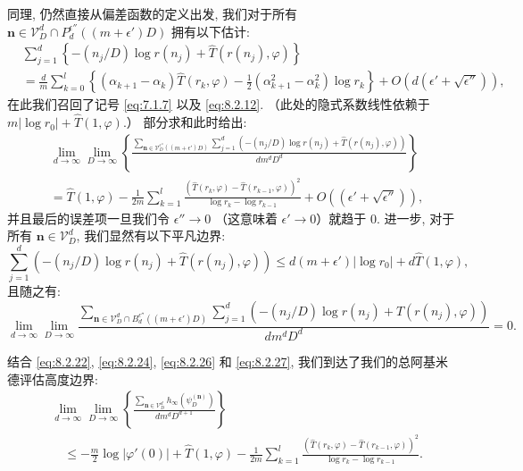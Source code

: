 同理, 仍然直接从偏差函数的定义出发, 我们对于所有 \(\mathbf{n} \in \mathcal{V}_D^d \cap P_d^{\epsilon''}((m+\epsilon')D)\) 
拥有以下估计:
\begin{equation}\label{eq:8.2.25}
\begin{aligned}
&\sum_{j=1}^{d} \left\{ -(n_j/D) \log r(n_j) + \widehat{T}(r(n_j), \varphi) \right\} \\
&= \frac{d}{m} \sum_{k=0}^{l} \left\{ (\alpha_{k+1} - \alpha_k) \widehat{T}(r_k, \varphi) - \frac{1}{2} (\alpha_{k+1}^2 - \alpha_k^2) \log r_k \right\} + O\left(d(\epsilon' + \sqrt{\epsilon''})\right),
\end{aligned}
\end{equation}
在此我们召回了记号 \eqref{eq:7.1.7} 以及 \eqref{eq:8.2.12}. 
（此处的隐式系数线性依赖于 \(m|\log r_0| + \widehat{T}(1,\varphi)\).） 
部分求和此时给出:
\begin{equation}\label{eq:8.2.26}
\begin{aligned}
&\lim_{d \to \infty} \lim_{D \to \infty} \left\{ \frac{\sum_{\mathbf{n} \in \mathcal{V}_D^{\epsilon''}((m+\epsilon')D)} \sum_{j=1}^d \left( -(n_j/D) \log r(n_j) + \widehat{T}(r(n_j), \varphi) \right)}{dm^d D^d} \right\} \\
&= \widehat{T}(1, \varphi) - \frac{1}{2m} \sum_{k=1}^l \frac{(\widehat{T}(r_k, \varphi) - \widehat{T}(r_{k-1}, \varphi))^2}{\log r_k - \log r_{k-1}} + O((\epsilon' + \sqrt{\epsilon''})),
\end{aligned}
\end{equation}
并且最后的误差项一旦我们令 \(\epsilon'' \to 0\) （这意味着 \(\epsilon' \to 0\)）就趋于 0. 
进一步, 对于所有 \(\mathbf{n} \in \mathcal{V}_D^d\), 我们显然有以下平凡边界:
\[ \sum_{j=1}^{d} \left( -(n_j/D) \log r(n_j) + \widehat{T}(r(n_j), \varphi) \right) \le d(m + \epsilon') |\log r_0| + d\widehat{T}(1, \varphi), \]
且随之有:
\begin{equation}\label{eq:8.2.27}
\lim_{d \to \infty} \lim_{D \to \infty} \frac{\sum_{\mathbf{n} \in \mathcal{V}_D^d \cap B_d^{\epsilon''}((m+\epsilon')D)} \sum_{j=1}^d \left( -(n_j/D) \log r(n_j) + \widehat{T}(r(n_j), \varphi) \right)}{dm^d D^d} = 0.
\end{equation}

结合 \eqref{eq:8.2.22}, \eqref{eq:8.2.24}, \eqref{eq:8.2.26} 和 \eqref{eq:8.2.27}, 我们到达了我们的总阿基米德评估高度边界:
\begin{equation}\label{eq:8.2.28}
\begin{aligned}
&\lim_{d \to \infty} \lim_{D \to \infty} \left\{ \frac{\sum_{\mathbf{n} \in \mathcal{V}_D^d} h_{\infty}(\psi_D^{(\mathbf{n})})}{dm^d D^{d+1}} \right\} \\
&\quad \leq -\frac{m}{2} \log |\varphi'(0)| + \widehat{T}(1,\varphi) - \frac{1}{2m} \sum_{k=1}^l \frac{(\widehat{T}(r_k,\varphi) - \widehat{T}(r_{k-1},\varphi))^2}{\log r_k - \log r_{k-1}}.
\end{aligned}
\end{equation}

